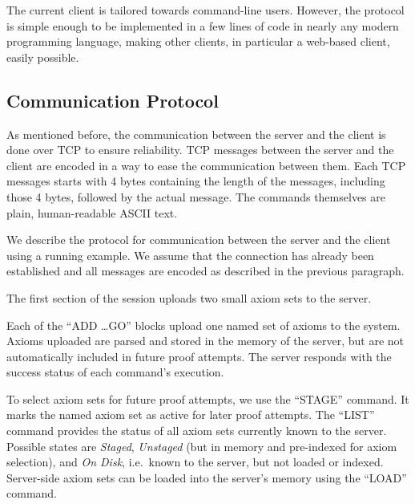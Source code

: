 \documentclass{article}
\begin{document}
The current client is tailored towards command-line users. However,
the protocol is simple enough to be implemented in a few lines of code
in nearly any modern programming language, making other clients, in
particular a web-based client, easily possible.


\subsection{Communication Protocol}
\label{sec:prot}

As mentioned before, the communication between the server and the
client is done over TCP to ensure reliability. TCP messages between
the server and the client are encoded in a way to ease the
communication between them. Each TCP messages starts with 4 bytes
containing the length of the messages, including those 4 bytes,
followed by the actual message. The commands themselves are plain,
human-readable ASCII text.

We describe the protocol for communication between the server and the
client using a running example. We assume that the connection has
already been established and all messages are encoded as described in
the previous paragraph.

The first section of the session uploads two small axiom sets to the
server.  

 Each of the
``ADD \ldots GO'' blocks upload one named set of axioms to the
system. Axioms uploaded are parsed and stored in the memory of the
server, but are not automatically included in future proof
attempts. The server responds with the success status of each
command's execution.

 To select
axiom sets for future proof attempts, we use the ``STAGE'' command. It
marks the named axiom set as active for later proof attempts. The
``LIST'' command provides the status of all axiom sets currently known
to the server. Possible states are \emph{Staged}, \emph{Unstaged} (but
in memory and pre-indexed for axiom selection), and \emph{On Disk},
i.e.\ known to the server, but not loaded or indexed. Server-side
axiom sets can be loaded into the server's memory using the ``LOAD''
command.
\end{document}
